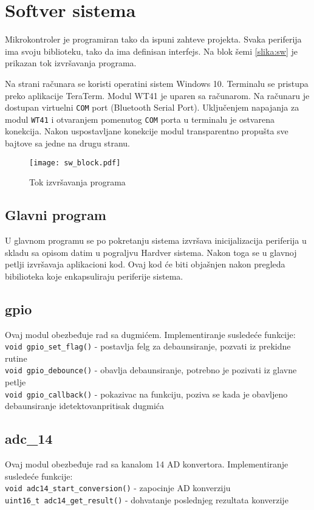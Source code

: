 \section{Softver sistema}

Mikrokontroler je programiran tako da ispuni zahteve projekta. Svaka periferija ima svoju biblioteku, tako da ima definisan interfejs. Na blok šemi \ref{slika:sw} je prikazan tok izvršavanja programa.

Na strani računara se koristi operatini sistem Windows 10. Terminalu se pristupa preko aplikacije TeraTerm. Modul WT41 je uparen sa računarom. Na računaru je dostupan virtuelni \verb+COM+ port (Bluetooth Serial Port). Uključenjem napajanja za modul \verb+WT41+ i otvaranjem pomenutog \verb+COM+ porta u terminalu je ostvarena konekcija. Nakon uspostavljane konekcije modul transparentno propušta sve bajtove sa jedne na drugu stranu.

\begin{figure}[h!]
\centering
\texttt{[image: sw\_block.pdf]}
\caption{Tok izvršavanja programa}
\label{slika:hw}
\end{figure}

\subsection{Glavni program}
U glavnom programu se po pokretanju sistema izvršava inicijalizacija periferija u skladu sa opisom datim u pograljvu Hardver sistema. Nakon toga se u glavnoj petlji izvršavaja aplikacioni kod. Ovaj kod će biti objašnjen nakon pregleda bibilioteka koje enkapsuliraju periferije sistema.

\subsection{gpio}
Ovaj modul obezbeđuje rad sa dugmićem. Implementiranje susledeće funkcije:\\
\verb+void gpio_set_flag()+ - postavlja felg za debaunsiranje, pozvati iz prekidne rutine\\
\verb+void gpio_debounce()+ - obavlja debaunsiranje, potrebno je pozivati iz glavne petlje\\
\verb+void gpio_callback()+ - pokazivac na funkciju, poziva se kada je obavljeno debaunsiranje idetektovanpritisak dugmića\\

\subsection{adc\_14}
Ovaj modul obezbeđuje rad sa kanalom 14 AD konvertora. Implementiranje susledeće funkcije:\\
\verb+void adc14_start_conversion()+ - zapocinje AD konverziju\\
\verb+uint16_t adc14_get_result()+ - dohvatanje poslednjeg rezultata konverzije\\

